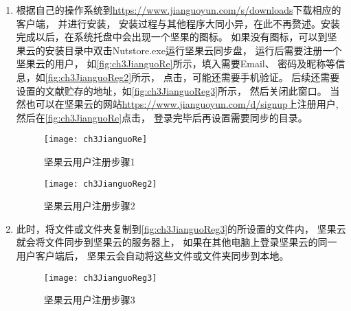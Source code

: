 \documentclass[theorem=false,mathfont=none,openany,sub3section]{easybook}
\begin{document}
\begin{enumerate}
	\item 根据自己的操作系统到\url{https://www.jianguoyun.com/s/downloads}下载相应的客户端，
	并进行安装，
	安装过程与其他程序大同小异，在此不再赘述。安装完成以后，在系统托盘中会出现一个坚果的图标。
	如果没有图标，可以到坚果云的安装目录中双击Nutstore.exe运行坚果云同步盘，
	运行后需要注册一个坚果云的用户，
	如\autoref{fig:ch3JianguoRe}所示，填入需要Email、
	密码及昵称等信息，如\autoref{fig:ch3JianguoReg2}所示，
	点击，可能还需要手机验证。
	后续还需要设置的文献贮存的地址，如\autoref{fig:ch3JianguoReg3}所示，
	然后关闭此窗口。
	当然也可以在坚果云的网站\url{https://www.jianguoyun.com/d/signup}上注册用户,
	然后在\autoref{fig:ch3JianguoRe}点击，
	登录完毕后再设置需要同步的目录。
	
	\begin{figure}[htbp]
		\centering
		\begin{minipage}[t]{\dimexpr0.5\textwidth-4em}
			\centering
			\texttt{[image: ch3JianguoRe]}
			\caption{坚果云用户注册步骤1}
			\label{fig:ch3JianguoRe}
		\end{minipage}
		\centering
		\begin{minipage}[t]{\dimexpr0.5\textwidth-4em}
			\centering
			\texttt{[image: ch3JianguoReg2]}
			\caption{坚果云用户注册步骤2}
			\label{fig:ch3JianguoReg2}
		\end{minipage}	
	\end{figure}
	
	
	
	\item 此时，将文件或文件夹复制到\autoref{fig:ch3JianguoReg3}的所设置的文件内，
	坚果云就会将文件同步到坚果云的服务器上，
	如果在其他电脑上登录坚果云的同一用户客户端后，
	坚果云会自动将这些文件或文件夹同步到本地。
	\begin{figure}
		\centering
		\texttt{[image: ch3JianguoReg3]}
		\caption{坚果云用户注册步骤3}
		\label{fig:ch3JianguoReg3}
		

\end{figure}
\end{enumerate}
\end{document}
